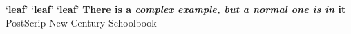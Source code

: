 \documentclass{article}
\begin{document}
        `{\bfseries leaf}' \quad `{\bfseries leaf\/}' \quad `\textbf{leaf}'\newline
        \sffamily\textbf{There is a \textit{complex example, 
        but \textnormal{a normal one} is in} it}\newline
        {\fontsize{14}{17}
        \selectfont PostScrip New Century Schoolbook}
        
\end{document}
